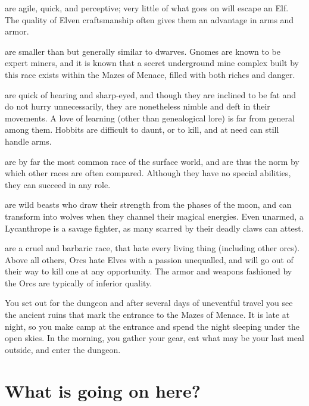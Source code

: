 \item[\bb{Elves {\rm and }Drows}]%
are agile, quick, and perceptive; very little of
what goes on will escape an Elf.  The quality of Elven craftsmanship often
gives them an advantage in arms and armor.

\item[\bb{Gnomes}]%
are smaller than but generally similar to dwarves.  Gnomes are
known to be expert miners, and it is known that a secret underground mine
complex built by this race exists within the Mazes of Menace, filled with
both riches and danger.

\item[\bb{Hobbits}]%
are quick of hearing and sharp-eyed, and though they are
inclined to be fat and do not hurry unnecessarily, they are nonetheless nimble
and deft in their movements. A love of learning (other than genealogical lore)
is far from general among them. Hobbits are difficult to daunt, or to kill,
and at need can still handle arms.

\item[\bb{Humans}]%
are by far the most common race of the surface world, and
are thus the norm by which other races are often compared.  Although
they have no special abilities, they can succeed in any role.

\item[\bb{Lycanthropes}]%
are wild beasts who draw their strength from the phases
of the moon,  and can transform into wolves when they channel their magical
energies.  Even unarmed,  a Lycanthrope is a savage fighter,  as many
scarred by their deadly claws can attest.

\item[\bb{Orcs}]%
are a cruel and barbaric race, that hate every living thing
(including other orcs).  Above all others, Orcs hate Elves with a passion
unequalled, and will go out of their way to kill one at any opportunity.
The armor and weapons fashioned by the Orcs are typically of inferior quality.
\elist
\nd %

You set out for the dungeon and after several days of uneventful
travel you see the ancient ruins that mark the entrance to the Mazes
of Menace.  It is late at night, so you make camp at the entrance and
spend the night sleeping under the open skies.  In the morning, you
gather your gear, eat what may be your last meal outside, and enter
the dungeon.
\section{What is going on here?}

